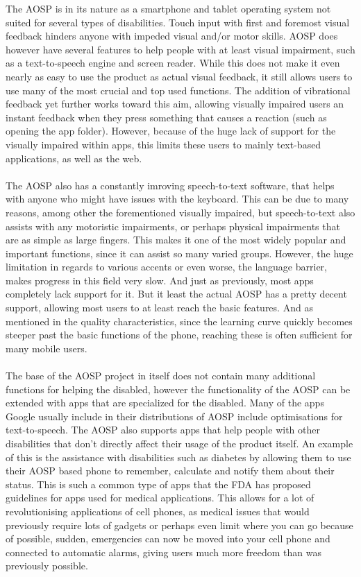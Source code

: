 \documentclass[conference]{IEEEtran}
\begin{document}
The AOSP is in its nature as a smartphone and tablet operating system not suited for several types of disabilities. Touch input with first and foremost visual feedback hinders anyone with impeded visual and/or motor skills. AOSP does however have several features to help people with at least visual impairment, such as a text-to-speech engine and screen reader.\cite{android-disabled-help} While this does not make it even nearly as easy to use the product as actual visual feedback, it still allows users to use many of the most crucial and top used functions. The addition of vibrational feedback yet further works toward this aim, allowing visually impaired users an instant feedback when they press something that causes a reaction (such as opening the app folder). However, because of the huge lack of support for the visually impaired within apps, this limits these users to mainly text-based applications, as well as the web. 
\\\\The AOSP also has a constantly imroving speech-to-text software, that helps with anyone who might have issues with the keyboard. This can be due to many reasons, among other the forementioned visually impaired, but speech-to-text also assists with any motoristic impairments, or perhaps physical impairments that are as simple as large fingers. This makes it one of the most widely popular and important functions, since it can assist so many varied groups. However, the huge limitation in regards to various accents or even worse, the language barrier, makes progress in this field very slow. And just as previously, most apps completely lack support for it. But it least the actual AOSP has a pretty decent support, allowing most users to at least reach the basic features. And as mentioned in the quality characteristics, since the learning curve quickly becomes steeper past the basic functions of the phone, reaching these is often sufficient for many mobile users. 
\\\\The base of the AOSP project in itself does not contain many additional functions for helping the disabled, however the functionality of the AOSP can be extended with apps that are specialized for the disabled.\cite{android-disabled-apps} Many of the apps Google usually include in their distributions of AOSP include optimisations for text-to-speech.\cite{android-disabled-help} The AOSP also supports apps that help people with other disabilities that don't directly affect their usage of the product itself. An example of this is the assistance with disabilities such as diabetes by allowing them to use their AOSP based phone to remember, calculate and notify them about their status.\cite{android-disabled-diabetes} This is such a common type of apps that the FDA has proposed guidelines for apps used for medical applications.\cite{android-disabled-FDA} This allows for a lot of revolutionising applications of cell phones, as medical issues that would previously require lots of gadgets or perhaps even limit where you can go because of possible, sudden, emergencies can now be moved into your cell phone and connected to automatic alarms, giving users much more freedom than was previously possible. 
\end{document}
